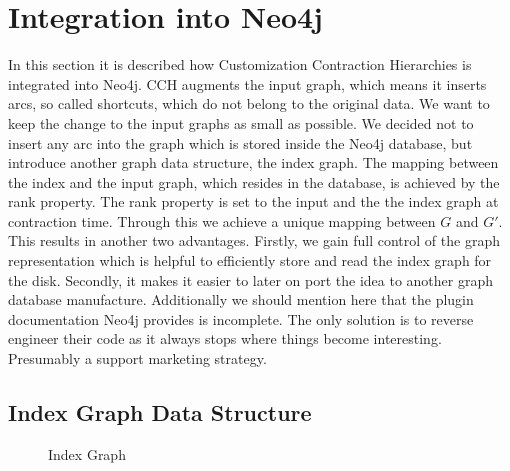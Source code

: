 \chapter{Integration into Neo4j}

In this section it is described how Customization Contraction Hierarchies \cite{CCH} is integrated into Neo4j.
CCH augments the input graph, which means it inserts arcs, so called shortcuts, which do not belong to the original data.
We want to keep the change to the input graphs as small as possible.
We decided not to insert any arc into the graph which is stored inside the Neo4j database, but introduce another graph data structure, the index graph.
The mapping between the index and the input graph, which resides in the database, is achieved by the rank property.
The rank property is set to the input and the the index graph at contraction time.
Through this we achieve a unique mapping between $G$ and $G'$.
This results in another two advantages.
Firstly, we gain full control of the graph representation which is helpful to efficiently store and read the index graph for the disk.
Secondly, it makes it easier to later on port the idea to another graph database manufacture.
Additionally we should mention here that the plugin documentation Neo4j provides is incomplete. 
The only solution is to reverse engineer their code as it always stops where things become interesting. 
Presumably a support marketing strategy. 

\section{Index Graph Data Structure}\label{sec:index_graph}

\begin{figure}
     
    
    \caption{Index Graph}
    \label{uml:index_graph}
\end{figure}

